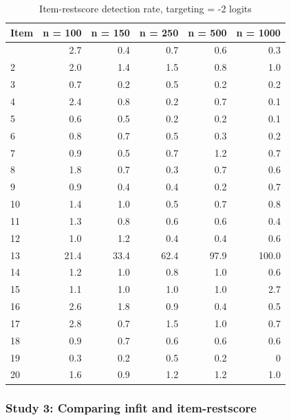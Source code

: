 \documentclass[
  letterpaper,
  DIV=11,
  numbers=noendperiod]{scrartcl}
\begin{document}
\begin{longtable}[]{@{}lrrrrr@{}}

\caption{\label{tbl-irresults2}Item-restscore detection rate, targeting
= -2 logits}

\tabularnewline

\toprule\noalign{}
Item & n = 100 & n = 150 & n = 250 & n = 500 & n = 1000 \\
\midrule\noalign{}
\endhead
\bottomrule\noalign{}
\endlastfoot
1 & 2.7 & 0.4 & 0.7 & 0.6 & 0.3 \\
2 & 2.0 & 1.4 & 1.5 & 0.8 & 1.0 \\
3 & 0.7 & 0.2 & 0.5 & 0.2 & 0.2 \\
4 & 2.4 & 0.8 & 0.2 & 0.7 & 0.1 \\
5 & 0.6 & 0.5 & 0.2 & 0.2 & 0.1 \\
6 & 0.8 & 0.7 & 0.5 & 0.3 & 0.2 \\
7 & 0.9 & 0.5 & 0.7 & 1.2 & 0.7 \\
8 & 1.8 & 0.7 & 0.3 & 0.7 & 0.6 \\
9 & 0.9 & 0.4 & 0.4 & 0.2 & 0.7 \\
10 & 1.4 & 1.0 & 0.5 & 0.7 & 0.8 \\
11 & 1.3 & 0.8 & 0.6 & 0.6 & 0.4 \\
12 & 1.0 & 1.2 & 0.4 & 0.4 & 0.6 \\
13 & 21.4 & 33.4 & 62.4 & 97.9 & 100.0 \\
14 & 1.2 & 1.0 & 0.8 & 1.0 & 0.6 \\
15 & 1.1 & 1.0 & 1.0 & 1.0 & 2.7 \\
16 & 2.6 & 1.8 & 0.9 & 0.4 & 0.5 \\
17 & 2.8 & 0.7 & 1.5 & 1.0 & 0.7 \\
18 & 0.9 & 0.7 & 0.6 & 0.6 & 0.6 \\
19 & 0.3 & 0.2 & 0.5 & 0.2 & 0 \\
20 & 1.6 & 0.9 & 1.2 & 1.2 & 1.0 \\

\end{longtable}

\subsubsection{Study 3: Comparing infit and
item-restscore}\label{sec-infirresults}
\end{document}
